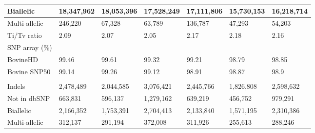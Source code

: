 \documentclass[../main.tex]{subfiles}
\begin{document}
\begin{landscape}
\begin{table}
\begin{tabular}{|l|l|l|l|l|l|l|}
    \hline
    Biallelic             & 18,347,962            & 18,053,396                  & 17,528,249                & 17,111,806            & 15,730,153                  & 16,218,714                 \\ 
    \hline
    Multi-allelic         & 246,220               & 67,328                      & 63,789                    & 136,787               & 47,293                      & 54,203                     \\ 
    \hline
    Ti/Tv ratio           & 2.09                  & 2.07                        & 2.05                      & 2.17                  & 2.18                        & 2.16                       \\ 
    \hline
    SNP array (\%)        &                       &                             &                           &                       &                             &                            \\ 
    \hline
    BovineHD              & 99.46                 & 99.61                       & 99.32                     & 99.21                 & 98.79                       & 98.85                      \\ 
    \hline
    Bovine SNP50          & 99.14                 & 99.26                       & 99.12                     & 98.91                 & 98.87                       & 98.9                       \\ 
    \hline
    \multicolumn{7}{|l|}{}                                                                                                                                                                     \\ 
    \hline
    Indels                & 2,478,489             & 2,044,585                   & 3,076,421                 & 2,445,766             & 1,826,808                   & 2,598,632                  \\ 
    \hline
    Not in dbSNP          & 663,831               & 596,137                     & 1,279,162                 & 639,219               & 456,752                     & 979,291                    \\ 
    \hline
    Biallelic             & 2,166,352             & 1,753,391                   & 2,704,413                 & 2,133,840             & 1,571,195                   & 2,310,386                  \\ 
    \hline
    Multi-allelic         & 312,137               & 291,194                     & 372,008                   & 311,926               & 255,613                     & 288,246                    \\ 

\end{tabular}
\end{table}
\end{landscape}
\end{document}
